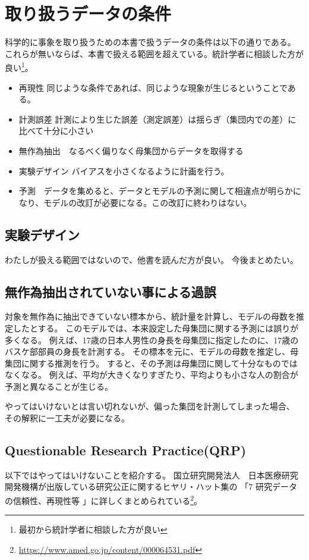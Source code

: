 \chapter{取り扱うデータの条件}
科学的に事象を取り扱うための本書で扱うデータの条件は以下の通りである。
これらが無いならば、本書で扱える範囲を超えている。統計学者に相談した方が良い\footnote{最初から統計学者に相談した方が良い}。

\begin{itemize}
    \item 再現性 同じような条件であれば、同じような現象が生じるということである。
    \item 計測誤差  計測により生じた誤差（測定誤差）は揺らぎ（集団内での差）に比べて十分に小さい
    \item 無作為抽出　なるべく偏りなく母集団からデータを取得する%
    \item 実験デザイン バイアスを小さくなるように計画を行う。
    \item 予測　データを集めると、データとモデルの予測に関して相違点が明らかになり、モデルの改訂が必要になる。この改訂に終わりはない。
\end{itemize}

\section{実験デザイン}
わたしが扱える範囲ではないので、他書を読んだ方が良い。
今後まとめたい。

\section{無作為抽出されていない事による過誤}
対象を無作為に抽出できていない標本から、統計量を計算し、モデルの母数を推定したとする。
このモデルでは、本来設定した母集団に関する予測には誤りが多くなる。
例えば、17歳の日本人男性の身長を母集団に指定したのに、17歳のバスケ部部員の身長を計測する。
その標本を元に、モデルの母数を推定し、母集団に関する推測を行う。
すると、その予測は母集団に関して十分なものではなくなる。
例えば、平均が大きくなりすぎたり、平均よりも小さな人の割合が予測と異なることが生じる。

やってはいけないとは言い切れないが、偏った集団を計測してしまった場合、
その解釈に一工夫が必要になる。


\section{Questionable Research Practice(QRP)}
以下ではやってはいけないことを紹介する。
国立研究開発法人　日本医療研究開発機構が出版している研究公正に関するヒヤリ・ハット集の
「7 研究データの信頼性、再現性等 」に詳しくまとめられている\footnote{\url{https://www.amed.go.jp/content/000064531.pdf}}。

